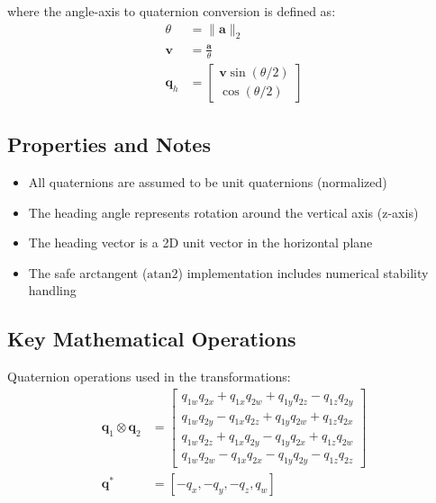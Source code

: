 where the angle-axis to quaternion conversion is defined as:
\begin{align}
    \theta &= \|\mathbf{a}\|_2 \\
    \mathbf{v} &= \frac{\mathbf{a}}{\theta} \\
    \mathbf{q}_h &= \begin{bmatrix}
        \mathbf{v}\sin(\theta/2) \\
        \cos(\theta/2)
    \end{bmatrix}
\end{align}

\subsection*{Properties and Notes}
\begin{itemize}
    \item All quaternions are assumed to be unit quaternions (normalized)
    \item The heading angle represents rotation around the vertical axis (z-axis)
    \item The heading vector is a 2D unit vector in the horizontal plane
    \item The safe arctangent ($\text{atan2}$) implementation includes numerical stability handling
\end{itemize}

\subsection*{Key Mathematical Operations}
Quaternion operations used in the transformations:
\begin{align}
    \mathbf{q}_1 \otimes \mathbf{q}_2 &= \begin{bmatrix}
        q_{1w}q_{2x} + q_{1x}q_{2w} + q_{1y}q_{2z} - q_{1z}q_{2y} \\
        q_{1w}q_{2y} - q_{1x}q_{2z} + q_{1y}q_{2w} + q_{1z}q_{2x} \\
        q_{1w}q_{2z} + q_{1x}q_{2y} - q_{1y}q_{2x} + q_{1z}q_{2w} \\
        q_{1w}q_{2w} - q_{1x}q_{2x} - q_{1y}q_{2y} - q_{1z}q_{2z}
    \end{bmatrix} \\
    \mathbf{q}^* &= [-q_x, -q_y, -q_z, q_w]
\end{align}
